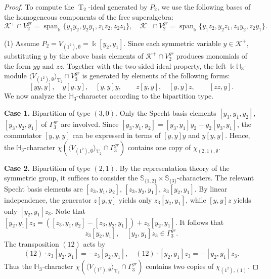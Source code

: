 \documentclass{amsart}
\theoremstyle{definition}
\theoremstyle{remark}
\numberwithin{equation}{section}
\newcommand{\lr}[1]{\langle #1 \rangle}
\def \Ga{\Gamma}
\def \k{\Bbbk}
\def \H{\mathbb{H}}
\def \S{\mathbb{S}}
\def \K{\mathcal{K}}
\def \sp{\operatorname{span}}
\def \T{\operatorname{T}}
\def \es{\emptyset}
\begin{document}
\begin{proof}
	To compute the $\T_2$-ideal generated by $P_2$, we use the following bases of the homogeneous components of the free superalgebra:
	\[
	\K^+ \cap V_2^{gr} = \sp_\k \{y_1y_2, y_2y_1, z_1z_2, z_2z_1\}, \quad \K^- \cap V_2^{gr} = \sp_\k \{y_1z_2, y_2z_1, z_1y_2, z_2y_1\}.
	\]
	
	(1) Assume $P_2=V_{(1^2), \es}=\k[y_2,y_1]$. Since each symmetric variable $y \in \K^+$, substituting $y$ by the above basis elements of $\K^+ \cap V_2^{gr}$ produces monomials of the form $yy$ and $zz$. Together with the two-sided ideal property, the left $\k\H_3$-module $\lr{V_{(1^2), \es}}_{\T_2} \cap V_3^{gr}$ is generated by elements of the following forms:
	\[
	[yy,y],\quad y[y,y],\quad [y,y]y,\qquad z[y,y],\quad [y,y]z,\qquad [zz,y].
	\]
	We now analyze the $\H_3$-character according to the bipartition type.
	
	\textbf{Case 1.} Bipartition of type $(3,0)$. Only the Specht basis elements $[y_3,y_1,y_2]$, $[y_3,y_2,y_1]$ of $\Ga_3^{gr}$ are involved. Since $[y_3,y_1,y_2]=[y_3,y_1]y_2-y_2[y_3,y_1]$, the commutator $[y,y,y]$ can be expressed in terms of $[y,y]y$ and $y[y,y]$. Hence, the $\H_3$-character $\chi(\lr{V_{(1^2), \es}}_{\T_2} \cap \Ga_3^{gr})$ contains one copy of $\chi_{(2,1),\es}$.
	
	\textbf{Case 2.} Bipartition of type $(2,1)$. By the representation theory of the symmetric group, it suffices to consider the $\S_{\{1,2\}} \times \S_{\{3\}}$-characters. The relevant Specht basis elements are $[z_3,y_1,y_2]$, $[z_3,y_2,y_1]$, $z_3[y_2,y_1]$. By linear independence, the generator $z[y,y]$ yields only $z_3[y_2,y_1]$,  while $[y,y]z$ yields only $[y_2,y_1]z_3$. Note that $[y_2,y_1]z_3=([z_3,y_1,y_2]-[z_3,y_2,y_1])+z_3[y_2,y_1]$. It follows that 
	\[
	z_3[y_2,y_1],\quad [y_2,y_1]z_3 \in \Ga_3^{gr}.
	\]
	The transposition $(12)$ acts by
	\[
	(12)\cdot z_3[y_2,y_1]=-z_3[y_2,y_1], \quad (12)\cdot [y_2,y_1]z_3=-[y_2,y_1]z_3.
	\]
	Thus the $\H_3$-character $\chi(\lr{V_{(1^2), \es}}_{\T_2} \cap \Ga_3^{gr})$ contains two copies of $\chi_{(1^2),(1)}$.
	

\end{proof}
\end{document}
